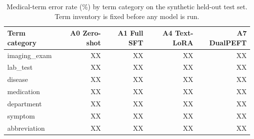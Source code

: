 \begin{table}[t]
\centering
\caption{Medical-term error rate (\%) by term category on the synthetic held-out test set. Term inventory is fixed before any model is run.}
\label{tab:table4_terminology}
\begin{tabular}{lrrrr}
\toprule
Term category & A0 Zero-shot & A1 Full SFT & A4 Text-LoRA & A7 DualPEFT \\
\midrule
imaging\_exam & XX & XX & XX & XX \\
lab\_test & XX & XX & XX & XX \\
disease & XX & XX & XX & XX \\
medication & XX & XX & XX & XX \\
department & XX & XX & XX & XX \\
symptom & XX & XX & XX & XX \\
abbreviation & XX & XX & XX & XX \\
\bottomrule
\end{tabular}
\end{table}
